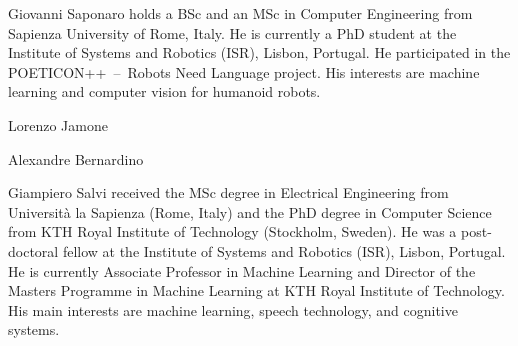 
\begin{IEEEbiography}{Giovanni Saponaro}
holds a BSc and an MSc in Computer Engineering from Sapienza University of Rome, Italy. He is currently a PhD student at the Institute of Systems and Robotics (ISR), Lisbon, Portugal. He participated in the POETICON++~--~Robots Need Language project. His interests are machine learning and computer vision for humanoid robots.
\end{IEEEbiography}

\begin{IEEEbiography}{Lorenzo Jamone}
\end{IEEEbiography}

\begin{IEEEbiography}{Alexandre Bernardino}
\end{IEEEbiography}

\begin{IEEEbiography}{Giampiero Salvi}
received the MSc degree in Electrical Engineering from Università la Sapienza (Rome, Italy) and the PhD degree in Computer Science from KTH Royal Institute of Technology (Stockholm, Sweden). He was a post-doctoral fellow at the Institute of Systems and Robotics (ISR), Lisbon, Portugal. He is currently Associate Professor in Machine Learning and Director of the Masters Programme in Machine Learning at KTH Royal Institute of Technology. His main interests are machine learning, speech technology, and cognitive systems.
\end{IEEEbiography}
